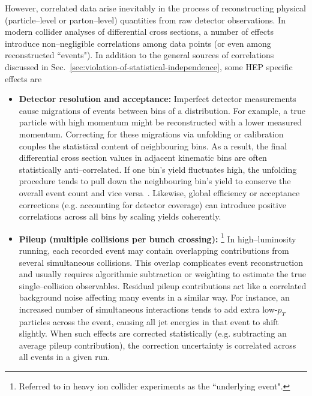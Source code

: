     However, correlated data arise inevitably in the process of reconstructing physical (particle--level or parton--level) quantities from raw detector observations.
    In modern collider analyses of differential cross sections, a number of effects introduce non--negligible correlations among data points (or even among reconstructed ``events").
    In addition to the general sources of correlations discussed in Sec.~\ref{sec:violation-of-statistical-independence}, some HEP specific effects are
    \begin{itemize}
        \item \textbf{Detector resolution and acceptance:}
        Imperfect detector measurements cause migrations of events between bins of a distribution.
        For example, a true particle with high momentum might be reconstructed with a lower measured momentum.
        Correcting for these migrations via unfolding or calibration couples the statistical content of neighbouring bins.
        As a result, the final differential cross section values in adjacent kinematic bins are often statistically anti--correlated.
        If one bin’s yield fluctuates high, the unfolding procedure tends to pull down the neighbouring bin’s yield to conserve the overall event count and vice versa~.
        Likewise, global efficiency or acceptance corrections (e.g. accounting for detector coverage) can introduce positive correlations across all bins by scaling yields coherently.
        \item \textbf{Pileup (multiple collisions per bunch crossing):}
        \footnote{
            Referred to in heavy ion collider experiments as the ``underlying event".
        }
        In high--luminosity running, each recorded event may contain overlapping contributions from several simultaneous collisions.
        This overlap complicates event reconstruction and usually requires algorithmic subtraction or weighting to estimate the true single--collision observables.
        Residual pileup contributions act like a correlated background noise affecting many events in a similar way.
        For instance, an increased number of simultaneous interactions tends to add extra low-$p_T$ particles across the event, causing all jet energies in that event to shift slightly.
        When such effects are corrected statistically (e.g. subtracting an average pileup contribution), the correction uncertainty is correlated across all events in a given run.

\end{itemize}
